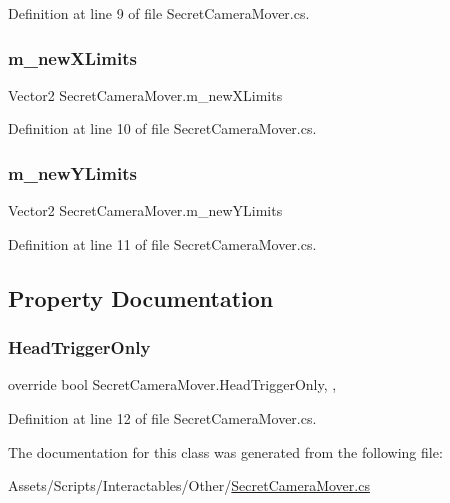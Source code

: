 Definition at line 9 of file Secret\+Camera\+Mover.\+cs.

\mbox{\label{class_secret_camera_mover_a2660712a9afc496aaeb5215cd8cde198}} 
\subsubsection{\texorpdfstring{m\+\_\+new\+X\+Limits}{m\_newXLimits}}
{\footnotesize\ttfamily Vector2 Secret\+Camera\+Mover.\+m\+\_\+new\+X\+Limits}



Definition at line 10 of file Secret\+Camera\+Mover.\+cs.

\mbox{\label{class_secret_camera_mover_a4b3d036d1210a7056541cc74dc15fc67}} 
\subsubsection{\texorpdfstring{m\+\_\+new\+Y\+Limits}{m\_newYLimits}}
{\footnotesize\ttfamily Vector2 Secret\+Camera\+Mover.\+m\+\_\+new\+Y\+Limits}



Definition at line 11 of file Secret\+Camera\+Mover.\+cs.



\subsection{Property Documentation}
\mbox{\label{class_secret_camera_mover_a84e8ff76db93c7ddc16bed5dcb668e3b}} 
\subsubsection{\texorpdfstring{Head\+Trigger\+Only}{HeadTriggerOnly}}
{\footnotesize\ttfamily override bool Secret\+Camera\+Mover.\+Head\+Trigger\+Only\hspace{0.3cm}{\ttfamily [get]}, {\ttfamily [set]}, {\ttfamily [protected]}}



Definition at line 12 of file Secret\+Camera\+Mover.\+cs.



The documentation for this class was generated from the following file\+:\begin{DoxyCompactItemize}
\item 
Assets/\+Scripts/\+Interactables/\+Other/\mbox{\hyperlink{_secret_camera_mover_8cs}{Secret\+Camera\+Mover.\+cs}}\end{DoxyCompactItemize}

